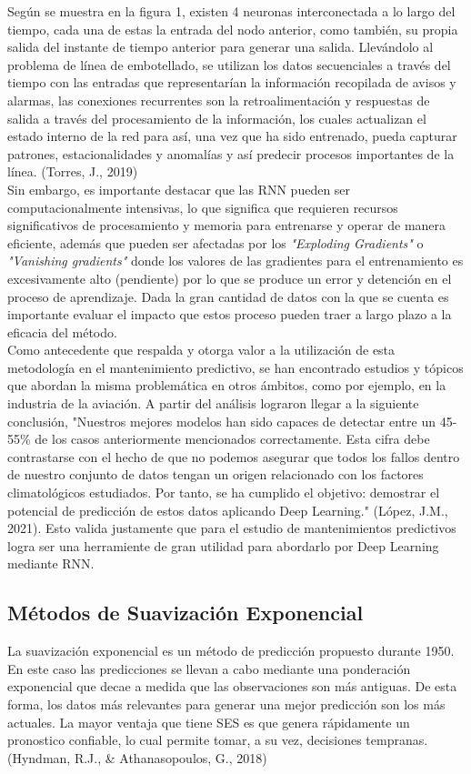 \documentclass[10pt]{article}
\begin{document}
Según se muestra en la figura 1, existen 4 neuronas interconectada a lo largo del tiempo, cada una de estas la entrada del nodo anterior, como también, su propia salida del instante de tiempo anterior para generar una salida. Llevándolo al problema de línea de embotellado, se utilizan los datos secuenciales a través del tiempo con las entradas que representarían la información recopilada de avisos y alarmas, las conexiones recurrentes son la retroalimentación y respuestas de salida a través del procesamiento de la información, los cuales actualizan el estado interno de la red para así, una vez que ha sido entrenado, pueda capturar patrones, estacionalidades y anomalías y así predecir procesos importantes de la línea. (Torres, J., 2019) \\ 
Sin embargo, es importante destacar que las RNN pueden ser computacionalmente intensivas, lo que significa que requieren recursos significativos de procesamiento y memoria para entrenarse y operar de manera eficiente, además que pueden ser afectadas por los \textit{"Exploding Gradients"} o \textit{"Vanishing gradients"} donde los valores de las gradientes para el entrenamiento es excesivamente alto (pendiente) por lo que se produce un error y detención en el proceso de aprendizaje. Dada la gran cantidad de datos con la que se cuenta es importante evaluar el impacto que estos proceso pueden traer a largo plazo a la eficacia del método. \\
Como antecedente que respalda y otorga valor a la utilización de esta metodología en el mantenimiento predictivo, se han encontrado estudios y tópicos que abordan la misma problemática en otros ámbitos, como por ejemplo, en la industria de la aviación. A partir del análisis lograron llegar a la siguiente conclusión, "Nuestros mejores modelos han sido capaces de detectar entre un 45-55\% de los casos anteriormente mencionados correctamente. Esta cifra debe contrastarse con el hecho de que no podemos asegurar que todos los fallos dentro de nuestro conjunto de datos tengan un
origen relacionado con los factores climatológicos estudiados. Por tanto, se ha cumplido
el objetivo: demostrar el potencial de predicción de estos datos aplicando Deep Learning." (López, J.M., 2021). Esto valida justamente que para el estudio de mantenimientos predictivos logra ser una herramiente de gran utilidad para abordarlo por Deep Learning mediante RNN.


\subsection{Métodos de Suavización Exponencial}
La suavización exponencial es un método de predicción propuesto durante 1950. En este caso las predicciones se llevan a cabo mediante una ponderación exponencial que decae a medida que las observaciones son más antiguas. De esta forma, los datos más relevantes para generar una mejor predicción son los más actuales. La mayor ventaja que tiene SES es que genera rápidamente un pronostico confiable, lo cual permite tomar, a su vez, decisiones tempranas. (Hyndman, R.J., \& Athanasopoulos, G., 2018)
\end{document}
